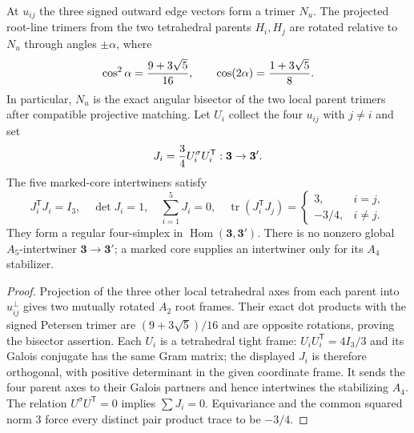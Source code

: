 \documentclass[11pt]{article}
\begin{document}
\begin{theorem}
\label{p1:thm:petersen-bisector-simplex}
At $u_{ij}$ the three signed outward edge vectors form a trimer $N_u$.
The projected root-line trimers from the two tetrahedral parents
$H_i,H_j$ are rotated relative to $N_u$ through angles $\pm\alpha$,
where
\[
 \cos^2\alpha={9+3\sqrt5\over16},\qquad
 \cos(2\alpha)={1+3\sqrt5\over8}.
\]
In particular, $N_u$ is the exact angular bisector of the two local
parent trimers after compatible projective matching.
Let $U_i$ collect the four $u_{ij}$ with $j\ne i$ and set
\[
 J_i={3\over4}U_i^\sigma U_i^{\mathsf T}:\mathbf3\to\mathbf3'.
\]
The five marked-core intertwiners satisfy
\[
 J_i^{\mathsf T}J_i=I_3,\quad\det J_i=1,\quad
 \sum_{i=1}^5J_i=0,\quad
 \operatorname{tr}(J_i^{\mathsf T}J_j)=
 \begin{cases}3,&i=j,\\-3/4,&i\ne j.\end{cases}
\]
They form a regular four-simplex in $\operatorname{Hom}(\mathbf3,\mathbf3')$.
There is no nonzero global $A_5$-intertwiner $\mathbf3\to\mathbf3'$;
a marked core supplies an intertwiner only for its $A_4$ stabilizer.
\end{theorem}
\begin{proof}
Projection of the three other local tetrahedral axes from each
parent into $u_{ij}^\perp$ gives two mutually rotated $A_2$ root
frames. Their exact dot products with the signed Petersen trimer
are $(9+3\sqrt5)/16$ and are opposite rotations, proving the
bisector assertion. Each $U_i$ is a tetrahedral tight frame:
$U_iU_i^{\mathsf T}=4I_3/3$ and its Galois conjugate has the same
Gram matrix; the displayed $J_i$ is therefore orthogonal, with
positive determinant in the given coordinate frame. It sends the
four parent axes to their Galois partners and hence intertwines the
stabilizing $A_4$. The relation $U^\sigma U^{\mathsf T}=0$ implies
$\sum J_i=0$. Equivariance and the common squared norm $3$
force every distinct pair product trace to be $-3/4$.
\end{proof}
\end{document}
